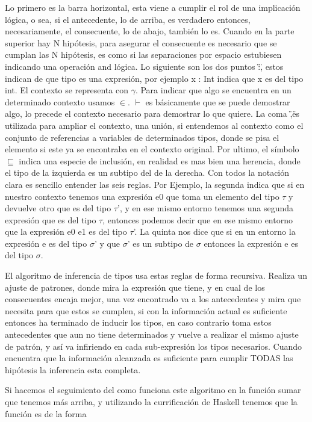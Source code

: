 Lo primero es la barra horizontal, esta viene a cumplir el rol de una implicación lógica, o sea, si el antecedente, lo de arriba, es verdadero entonces, necesariamente, el consecuente, lo de abajo, también lo es. Cuando en la parte superior hay N hipótesis, para asegurar el consecuente es necesario que se cumplan las N hipótesis, es como si las separaciones por espacio estubiesen indicando una operación and lógica.
Lo siguiente son los dos puntos \":\", estos indican de que tipo es una expresión, por ejemplo x : Int indica que x es del tipo int. El contexto se representa con $\gamma$. Para indicar que algo se encuentra en un determinado contexto usamos $\in$. $\vdash$ es básicamente que se puede demostrar algo, lo precede el contexto necesario para demostrar lo que quiere. La coma \",\" es utilizada para ampliar el contexto, una unión, si entendemos al contexto como el conjunto de referencias a variables de determinados tipos, donde se pisa el elemento si este ya se encontraba en el contexto original. Por ultimo, el símbolo $\sqsubseteq$ indica una especie de inclusión, en realidad es mas bien una herencia, donde el tipo de la izquierda es un subtipo del de la derecha.
Con todos la notación clara es sencillo entender las seis reglas.
Por Ejemplo, la segunda indica que si en nuestro contexto tenemos una expresión e0 que  toma un elemento del tipo  $\tau$ y devuelve otro que es del tipo $\tau$', y en ese mismo entorno tenemos una segunda expresión que es del tipo $\tau$, entonces podemos decir que en ese mismo entorno que la expresión e0 e1 es del tipo $\tau$'.
La quinta nos dice que si en un entorno la expresión e es del tipo $\sigma$' y que $\sigma$' es un subtipo de $\sigma$ entonces la expresión e es del tipo  $\sigma$.

El algoritmo de inferencia de tipos usa estas reglas de forma recursiva. Realiza un ajuste de patrones, donde mira la expresión que tiene, y en cual de los consecuentes encaja mejor, una vez encontrado va a los antecedentes y mira que necesita para que estos se cumplen, si con la información actual es suficiente entonces ha terminado de inducir los tipos, en caso contrario toma estos antecedentes que aun no tiene determinados y vuelve a realizar el mismo ajuste de patrón, y así va infiriendo en cada sub-expresión los tipos necesarios. Cuando encuentra que la información alcanzada es suficiente para cumplir TODAS las hipótesis la inferencia esta completa.

Si hacemos el seguimiento del como funciona este algoritmo en la función sumar que tenemos más arriba, y utilizando la currificación de Haskell tenemos que la función es de la forma


